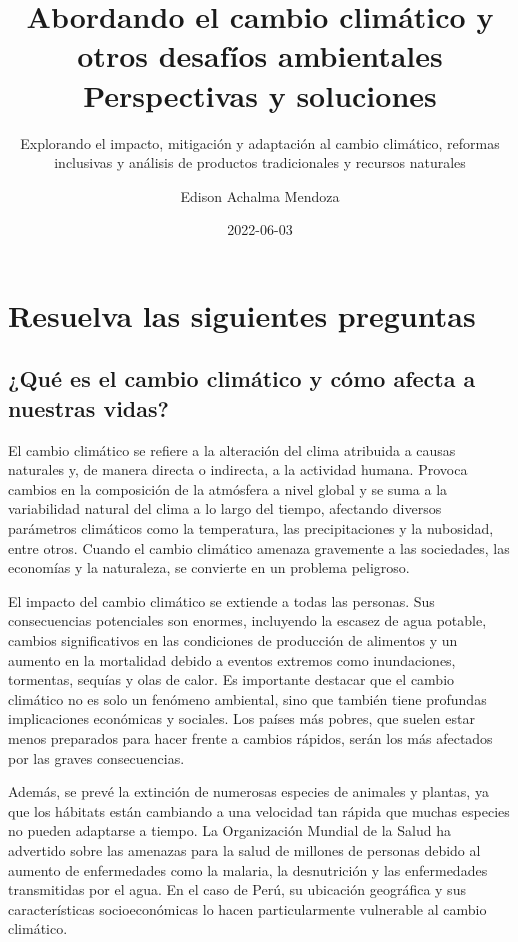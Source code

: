 \documentclass[
  letterpaper,
  DIV=11,
  numbers=noendperiod]{scrartcl}
\title{Abordando el cambio climático y otros desafíos ambientales
Perspectivas y soluciones}
\subtitle{Explorando el impacto, mitigación y adaptación al cambio
climático, reformas inclusivas y análisis de productos tradicionales y
recursos naturales}
\author{Edison Achalma Mendoza}
\date{2022-06-03}
\begin{document}
\maketitle
\ifdefined\Shaded\renewenvironment{Shaded}{\begin{tcolorbox}[interior hidden, breakable, boxrule=0pt, sharp corners, enhanced, borderline west={3pt}{0pt}{shadecolor}, frame hidden]}{\end{tcolorbox}}\fi

\hypertarget{resuelva-las-siguientes-preguntas}{%
\section{Resuelva las siguientes
preguntas}\label{resuelva-las-siguientes-preguntas}}

\hypertarget{quuxe9-es-el-cambio-climuxe1tico-y-cuxf3mo-afecta-a-nuestras-vidas}{%
\subsection{¿Qué es el cambio climático y cómo afecta a nuestras
vidas?}\label{quuxe9-es-el-cambio-climuxe1tico-y-cuxf3mo-afecta-a-nuestras-vidas}}

El cambio climático se refiere a la alteración del clima atribuida a
causas naturales y, de manera directa o indirecta, a la actividad
humana. Provoca cambios en la composición de la atmósfera a nivel global
y se suma a la variabilidad natural del clima a lo largo del tiempo,
afectando diversos parámetros climáticos como la temperatura, las
precipitaciones y la nubosidad, entre otros. Cuando el cambio climático
amenaza gravemente a las sociedades, las economías y la naturaleza, se
convierte en un problema peligroso.

El impacto del cambio climático se extiende a todas las personas. Sus
consecuencias potenciales son enormes, incluyendo la escasez de agua
potable, cambios significativos en las condiciones de producción de
alimentos y un aumento en la mortalidad debido a eventos extremos como
inundaciones, tormentas, sequías y olas de calor. Es importante destacar
que el cambio climático no es solo un fenómeno ambiental, sino que
también tiene profundas implicaciones económicas y sociales. Los países
más pobres, que suelen estar menos preparados para hacer frente a
cambios rápidos, serán los más afectados por las graves consecuencias.

Además, se prevé la extinción de numerosas especies de animales y
plantas, ya que los hábitats están cambiando a una velocidad tan rápida
que muchas especies no pueden adaptarse a tiempo. La Organización
Mundial de la Salud ha advertido sobre las amenazas para la salud de
millones de personas debido al aumento de enfermedades como la malaria,
la desnutrición y las enfermedades transmitidas por el agua. En el caso
de Perú, su ubicación geográfica y sus características socioeconómicas
lo hacen particularmente vulnerable al cambio climático.
\end{document}
